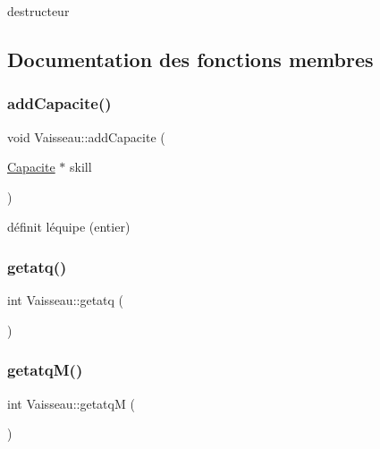 destructeur 



\subsection{Documentation des fonctions membres}
\mbox{\label{class_vaisseau_a04d7069231187e7dba26a06a0aaf2508}} 
\subsubsection{\texorpdfstring{add\+Capacite()}{addCapacite()}}
{\footnotesize\ttfamily void Vaisseau\+::add\+Capacite (\begin{DoxyParamCaption}\item[{\hyperlink{class_capacite}{Capacite} $\ast$}]{skill }\end{DoxyParamCaption})}



définit l\textquotesingle{}équipe (entier) 

\mbox{\label{class_vaisseau_a03d9f614943176d1e1d71d99f9d7f465}} 
\subsubsection{\texorpdfstring{getatq()}{getatq()}}
{\footnotesize\ttfamily int Vaisseau\+::getatq (\begin{DoxyParamCaption}{ }\end{DoxyParamCaption})}

\mbox{\label{class_vaisseau_a893c8a6199e3e79460891fafb0b16fba}} 
\subsubsection{\texorpdfstring{getatq\+M()}{getatqM()}}
{\footnotesize\ttfamily int Vaisseau\+::getatqM (\begin{DoxyParamCaption}{ }\end{DoxyParamCaption})}

\mbox{\label{class_vaisseau_a48d7facfa7c34a784bfbee4c4b1100ce}} 

